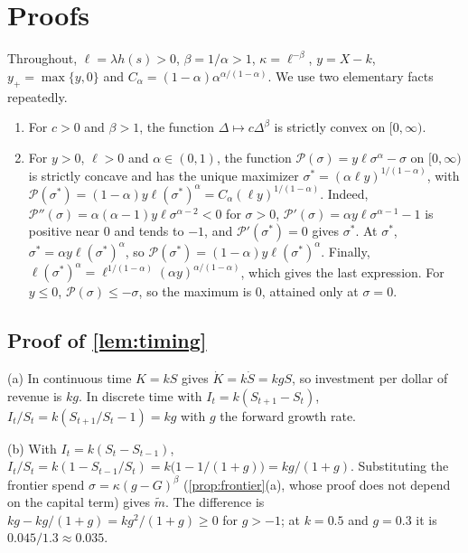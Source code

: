 
\section{Proofs}\label{app:proofs}

Throughout, $\ell=\lambda h(s)>0$, $\beta=1/\alpha>1$, $\kappa=\ell^{-\beta}$, $y=X-k$, $y_+=\max\{y,0\}$ and $C_\alpha=(1-\alpha)\alpha^{\alpha/(1-\alpha)}$. We use two elementary facts repeatedly.

\begin{enumerate}
\item[(F1)] For $c>0$ and $\beta>1$, the function $\Delta\mapsto c\Delta^{\beta}$ is strictly convex on $[0,\infty)$.
\item[(F2)] For $y>0$, $\ell>0$ and $\alpha\in(0,1)$, the function $\mathcal P(\sigma)=y\ell\sigma^{\alpha}-\sigma$ on $[0,\infty)$ is strictly concave and has the unique maximizer $\sigma^*=(\alpha\ell y)^{1/(1-\alpha)}$, with $\mathcal P(\sigma^*)=(1-\alpha)y\ell(\sigma^*)^{\alpha}=C_\alpha(\ell y)^{1/(1-\alpha)}$. Indeed, $\mathcal P''(\sigma)=\alpha(\alpha-1)y\ell\sigma^{\alpha-2}<0$ for $\sigma>0$, $\mathcal P'(\sigma)=\alpha y\ell\sigma^{\alpha-1}-1$ is positive near $0$ and tends to $-1$, and $\mathcal P'(\sigma^*)=0$ gives $\sigma^*$. At $\sigma^*$, $\sigma^*=\alpha y\ell(\sigma^*)^{\alpha}$, so $\mathcal P(\sigma^*)=(1-\alpha)y\ell(\sigma^*)^{\alpha}$. Finally, $\ell(\sigma^*)^{\alpha}=\ell^{1/(1-\alpha)}(\alpha y)^{\alpha/(1-\alpha)}$, which gives the last expression. For $y\le 0$, $\mathcal P(\sigma)\le-\sigma$, so the maximum is $0$, attained only at $\sigma=0$.
\end{enumerate}

\subsection*{Proof of \autoref{lem:timing}}

(a) In continuous time $K=kS$ gives $\dot K=k\dot S=kgS$, so investment per dollar of revenue is $kg$. In discrete time with $I_t=k(S_{t+1}-S_t)$, $I_t/S_t=k(S_{t+1}/S_t-1)=kg$ with $g$ the forward growth rate.

(b) With $I_t=k(S_t-S_{t-1})$, $I_t/S_t=k(1-S_{t-1}/S_t)=k\bigl(1-1/(1+g)\bigr)=kg/(1+g)$. Substituting the frontier spend $\sigma=\kappa(g-G)^{\beta}$ (\autoref{prop:frontier}(a), whose proof does not depend on the capital term) gives $\tilde m$. The difference is $kg-kg/(1+g)=kg^2/(1+g)\ge 0$ for $g>-1$; at $k=0.5$ and $g=0.3$ it is $0.045/1.3\approx 0.035$.

